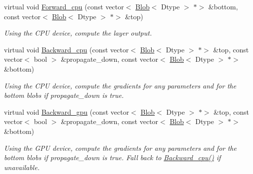 \begin{DoxyCompactItemize}
\mbox{\label{classcaffe_1_1_dummy_data_layer_a45a08d8ad118cf0e2da8a0aa3f7d704b}} 
virtual void \mbox{\hyperlink{classcaffe_1_1_dummy_data_layer_a45a08d8ad118cf0e2da8a0aa3f7d704b}{Forward\+\_\+cpu}} (const vector$<$ \mbox{\hyperlink{classcaffe_1_1_blob}{Blob}}$<$ Dtype $>$ $\ast$$>$ \&bottom, const vector$<$ \mbox{\hyperlink{classcaffe_1_1_blob}{Blob}}$<$ Dtype $>$ $\ast$$>$ \&top)
\begin{DoxyCompactList}\small\item\em Using the C\+PU device, compute the layer output. \end{DoxyCompactList}\item 
\mbox{\label{classcaffe_1_1_dummy_data_layer_ac62a3b84e25b23ad3aa7c19409282188}} 
virtual void \mbox{\hyperlink{classcaffe_1_1_dummy_data_layer_ac62a3b84e25b23ad3aa7c19409282188}{Backward\+\_\+cpu}} (const vector$<$ \mbox{\hyperlink{classcaffe_1_1_blob}{Blob}}$<$ Dtype $>$ $\ast$$>$ \&top, const vector$<$ bool $>$ \&propagate\+\_\+down, const vector$<$ \mbox{\hyperlink{classcaffe_1_1_blob}{Blob}}$<$ Dtype $>$ $\ast$$>$ \&bottom)
\begin{DoxyCompactList}\small\item\em Using the C\+PU device, compute the gradients for any parameters and for the bottom blobs if propagate\+\_\+down is true. \end{DoxyCompactList}\item 
\mbox{\label{classcaffe_1_1_dummy_data_layer_a6e9d7a207d517c4e6727e6f9792c414c}} 
virtual void \mbox{\hyperlink{classcaffe_1_1_dummy_data_layer_a6e9d7a207d517c4e6727e6f9792c414c}{Backward\+\_\+gpu}} (const vector$<$ \mbox{\hyperlink{classcaffe_1_1_blob}{Blob}}$<$ Dtype $>$ $\ast$$>$ \&top, const vector$<$ bool $>$ \&propagate\+\_\+down, const vector$<$ \mbox{\hyperlink{classcaffe_1_1_blob}{Blob}}$<$ Dtype $>$ $\ast$$>$ \&bottom)
\begin{DoxyCompactList}\small\item\em Using the G\+PU device, compute the gradients for any parameters and for the bottom blobs if propagate\+\_\+down is true. Fall back to \mbox{\hyperlink{classcaffe_1_1_dummy_data_layer_ac62a3b84e25b23ad3aa7c19409282188}{Backward\+\_\+cpu()}} if unavailable. \end{DoxyCompactList}\end{DoxyCompactItemize}
